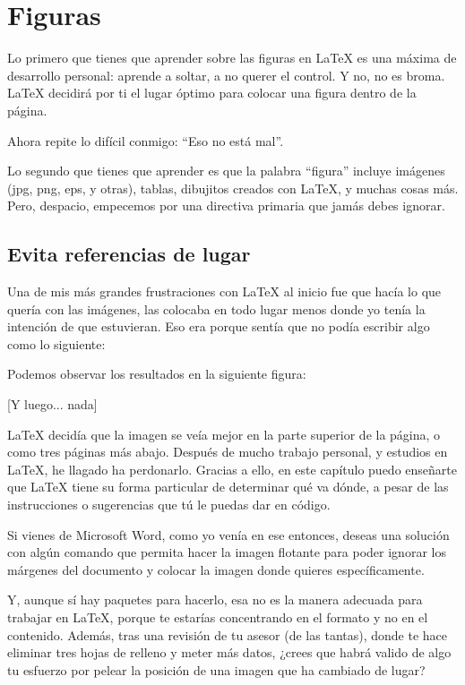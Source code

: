 \chapter{Figuras}
\label{cha:figuras}



Lo primero que tienes que aprender sobre las figuras en \LaTeX{} es una máxima de desarrollo personal: aprende a soltar, a no querer el control. Y no, no es broma. \LaTeX{} decidirá por ti el lugar óptimo para colocar una figura dentro de la página.

Ahora repite lo difícil conmigo: ``Eso no está mal''.

Lo segundo que tienes que aprender es que la palabra ``figura'' incluye imágenes (jpg, png, eps, y otras), tablas, dibujitos creados con \LaTeX{}, y muchas cosas más. Pero, despacio, empecemos por una directiva primaria que jamás debes ignorar.



\section{Evita referencias de lugar}
\label{sec:evita_referencias_de_lugar}



Una de mis más grandes frustraciones con \LaTeX{} al inicio fue que hacía lo que quería con las imágenes, las colocaba en todo lugar menos donde yo tenía la intención de que estuvieran. Eso era porque sentía que no podía escribir algo como lo siguiente:

\begin{displayquote}
Podemos observar los resultados en la siguiente figura:

[Y luego... nada]
\end{displayquote}

\LaTeX{} decidía que la imagen se veía mejor en la parte superior de la página, o como tres páginas más abajo. Después de mucho trabajo personal, y estudios en \LaTeX{}, he llagado ha perdonarlo. Gracias a ello, en este capítulo puedo enseñarte que \LaTeX{} tiene su forma particular de determinar qué va dónde, a pesar de las instrucciones o sugerencias que tú le puedas dar en código.

Si vienes de Microsoft Word, como yo venía en ese entonces, deseas una solución con algún comando que permita hacer la imagen flotante para poder ignorar los márgenes del documento y colocar la imagen donde quieres específicamente.

Y, aunque sí hay paquetes para hacerlo, esa no es la manera adecuada para trabajar en \LaTeX{}, porque te estarías concentrando en el formato y no en el contenido. Además, tras una revisión de tu asesor (de las tantas), donde te hace eliminar tres hojas de relleno y meter más datos, ¿crees que habrá valido de algo tu esfuerzo por pelear la posición de una imagen que ha cambiado de lugar?

